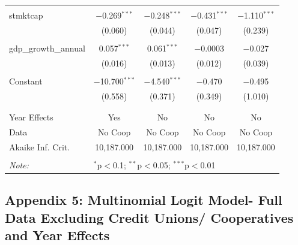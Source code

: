 \documentclass[a4paper, nobind]{templates/ociamthesis}
\begin{document}
\begin{table}[!htbp]
\begin{tabular}{@{\extracolsep{5pt}}lcccc}
  & & & & \\ 
 stmktcap & $-$0.269$^{***}$ & $-$0.248$^{***}$ & $-$0.431$^{***}$ & $-$1.110$^{***}$ \\ 
  & (0.060) & (0.044) & (0.047) & (0.239) \\ 
  & & & & \\ 
 gdp\_growth\_annual & 0.057$^{***}$ & 0.061$^{***}$ & $-$0.0003 & $-$0.027 \\ 
  & (0.016) & (0.013) & (0.012) & (0.039) \\ 
  & & & & \\ 
 Constant & $-$10.700$^{***}$ & $-$4.540$^{***}$ & $-$0.470 & $-$0.495 \\ 
  & (0.558) & (0.371) & (0.349) & (1.010) \\ 
  & & & & \\ 
\hline \\[-1.8ex] 
Year Effects & Yes & No & No & No \\ 
Data & No Coop & No Coop & No Coop & No Coop \\ 
Akaike Inf. Crit. & 10,187.000 & 10,187.000 & 10,187.000 & 10,187.000 \\ 
\hline 
\hline \\[-1.8ex] 
\textit{Note:}  & \multicolumn{4}{l}{$^{*}$p$<$0.1; $^{**}$p$<$0.05; $^{***}$p$<$0.01} \\ 
\end{tabular} 
\end{table}

\newpage

\hypertarget{appendix-5-multinomial-logit-model--full-data-excluding-credit-unions-cooperatives-and-year-effects}{%
\subsection{Appendix 5: Multinomial Logit Model- Full Data Excluding Credit Unions/ Cooperatives and Year Effects}\label{appendix-5-multinomial-logit-model--full-data-excluding-credit-unions-cooperatives-and-year-effects}}
\end{document}
